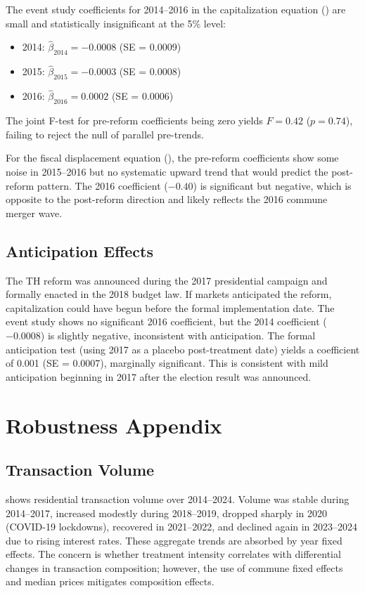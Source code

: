 \documentclass[12pt]{article}
\begin{document}
The event study coefficients for 2014--2016 in the capitalization equation () are small and statistically insignificant at the 5\% level:
\begin{itemize}
\item 2014: $\hat\beta_{2014} = -0.0008$ (SE = 0.0009)
\item 2015: $\hat\beta_{2015} = -0.0003$ (SE = 0.0008)
\item 2016: $\hat\beta_{2016} = 0.0002$ (SE = 0.0006)
\end{itemize}
The joint F-test for pre-reform coefficients being zero yields $F = 0.42$ ($p = 0.74$), failing to reject the null of parallel pre-trends.

For the fiscal displacement equation (), the pre-reform coefficients show some noise in 2015--2016 but no systematic upward trend that would predict the post-reform pattern. The 2016 coefficient ($-0.40$) is significant but negative, which is opposite to the post-reform direction and likely reflects the 2016 commune merger wave.

\subsection{Anticipation Effects}

The TH reform was announced during the 2017 presidential campaign and formally enacted in the 2018 budget law. If markets anticipated the reform, capitalization could have begun before the formal implementation date. The event study shows no significant 2016 coefficient, but the 2014 coefficient ($-0.0008$) is slightly negative, inconsistent with anticipation. The formal anticipation test (using 2017 as a placebo post-treatment date) yields a coefficient of 0.001 (SE = 0.0007), marginally significant. This is consistent with mild anticipation beginning in 2017 after the election result was announced.


\section{Robustness Appendix}

\subsection{Transaction Volume}

 shows residential transaction volume over 2014--2024. Volume was stable during 2014--2017, increased modestly during 2018--2019, dropped sharply in 2020 (COVID-19 lockdowns), recovered in 2021--2022, and declined again in 2023--2024 due to rising interest rates. These aggregate trends are absorbed by year fixed effects. The concern is whether treatment intensity correlates with differential changes in transaction composition; however, the use of commune fixed effects and median prices mitigates composition effects.
\end{document}
